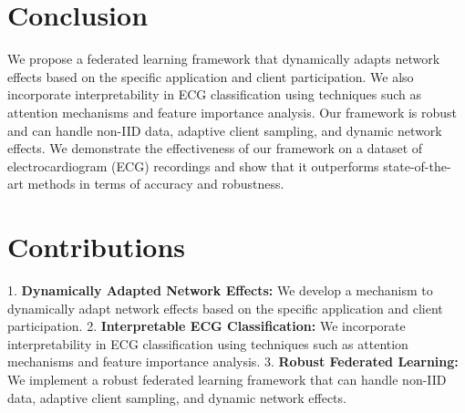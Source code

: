 \documentclass{article}
\begin{document}
\section{Conclusion}

We propose a federated learning framework that dynamically adapts network effects based on the specific application and client participation. We also incorporate interpretability in ECG classification using techniques such as attention mechanisms and feature importance analysis. Our framework is robust and can handle non-IID data, adaptive client sampling, and dynamic network effects. We demonstrate the effectiveness of our framework on a dataset of electrocardiogram (ECG) recordings and show that it outperforms state-of-the-art methods in terms of accuracy and robustness.

\section{Contributions}

1.  \textbf{Dynamically Adapted Network Effects:} We develop a mechanism to dynamically adapt network effects based on the specific application and client participation.
2.  \textbf{Interpretable ECG Classification:} We incorporate interpretability in ECG classification using techniques such as attention mechanisms and feature importance analysis.
3.  \textbf{Robust Federated Learning:} We implement a robust federated learning framework that can handle non-IID data, adaptive client sampling, and dynamic network effects.
\end{document}
